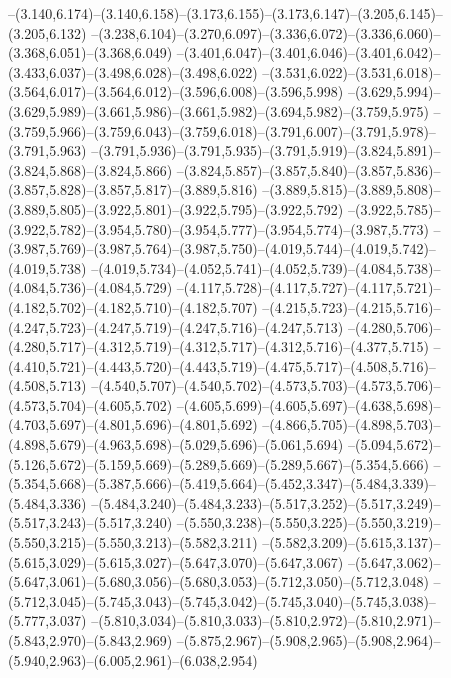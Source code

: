   --(3.140,6.174)--(3.140,6.158)--(3.173,6.155)--(3.173,6.147)--(3.205,6.145)--(3.205,6.132)%
  --(3.238,6.104)--(3.270,6.097)--(3.336,6.072)--(3.336,6.060)--(3.368,6.051)--(3.368,6.049)%
  --(3.401,6.047)--(3.401,6.046)--(3.401,6.042)--(3.433,6.037)--(3.498,6.028)--(3.498,6.022)%
  --(3.531,6.022)--(3.531,6.018)--(3.564,6.017)--(3.564,6.012)--(3.596,6.008)--(3.596,5.998)%
  --(3.629,5.994)--(3.629,5.989)--(3.661,5.986)--(3.661,5.982)--(3.694,5.982)--(3.759,5.975)%
  --(3.759,5.966)--(3.759,6.043)--(3.759,6.018)--(3.791,6.007)--(3.791,5.978)--(3.791,5.963)%
  --(3.791,5.936)--(3.791,5.935)--(3.791,5.919)--(3.824,5.891)--(3.824,5.868)--(3.824,5.866)%
  --(3.824,5.857)--(3.857,5.840)--(3.857,5.836)--(3.857,5.828)--(3.857,5.817)--(3.889,5.816)%
  --(3.889,5.815)--(3.889,5.808)--(3.889,5.805)--(3.922,5.801)--(3.922,5.795)--(3.922,5.792)%
  --(3.922,5.785)--(3.922,5.782)--(3.954,5.780)--(3.954,5.777)--(3.954,5.774)--(3.987,5.773)%
  --(3.987,5.769)--(3.987,5.764)--(3.987,5.750)--(4.019,5.744)--(4.019,5.742)--(4.019,5.738)%
  --(4.019,5.734)--(4.052,5.741)--(4.052,5.739)--(4.084,5.738)--(4.084,5.736)--(4.084,5.729)%
  --(4.117,5.728)--(4.117,5.727)--(4.117,5.721)--(4.182,5.702)--(4.182,5.710)--(4.182,5.707)%
  --(4.215,5.723)--(4.215,5.716)--(4.247,5.723)--(4.247,5.719)--(4.247,5.716)--(4.247,5.713)%
  --(4.280,5.706)--(4.280,5.717)--(4.312,5.719)--(4.312,5.717)--(4.312,5.716)--(4.377,5.715)%
  --(4.410,5.721)--(4.443,5.720)--(4.443,5.719)--(4.475,5.717)--(4.508,5.716)--(4.508,5.713)%
  --(4.540,5.707)--(4.540,5.702)--(4.573,5.703)--(4.573,5.706)--(4.573,5.704)--(4.605,5.702)%
  --(4.605,5.699)--(4.605,5.697)--(4.638,5.698)--(4.703,5.697)--(4.801,5.696)--(4.801,5.692)%
  --(4.866,5.705)--(4.898,5.703)--(4.898,5.679)--(4.963,5.698)--(5.029,5.696)--(5.061,5.694)%
  --(5.094,5.672)--(5.126,5.672)--(5.159,5.669)--(5.289,5.669)--(5.289,5.667)--(5.354,5.666)%
  --(5.354,5.668)--(5.387,5.666)--(5.419,5.664)--(5.452,3.347)--(5.484,3.339)--(5.484,3.336)%
  --(5.484,3.240)--(5.484,3.233)--(5.517,3.252)--(5.517,3.249)--(5.517,3.243)--(5.517,3.240)%
  --(5.550,3.238)--(5.550,3.225)--(5.550,3.219)--(5.550,3.215)--(5.550,3.213)--(5.582,3.211)%
  --(5.582,3.209)--(5.615,3.137)--(5.615,3.029)--(5.615,3.027)--(5.647,3.070)--(5.647,3.067)%
  --(5.647,3.062)--(5.647,3.061)--(5.680,3.056)--(5.680,3.053)--(5.712,3.050)--(5.712,3.048)%
  --(5.712,3.045)--(5.745,3.043)--(5.745,3.042)--(5.745,3.040)--(5.745,3.038)--(5.777,3.037)%
  --(5.810,3.034)--(5.810,3.033)--(5.810,2.972)--(5.810,2.971)--(5.843,2.970)--(5.843,2.969)%
  --(5.875,2.967)--(5.908,2.965)--(5.908,2.964)--(5.940,2.963)--(6.005,2.961)--(6.038,2.954)%
